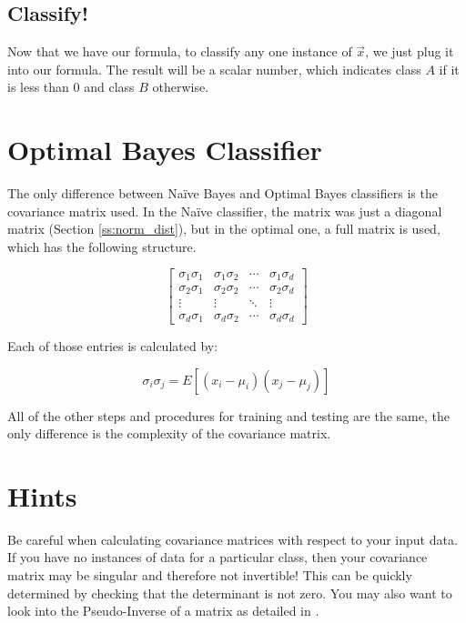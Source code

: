 \documentclass{article}
\begin{document}
\subsection{Classify!}

Now that we have our formula, to classify any one instance of
$\vec{x}$, we just plug it into our formula.  The result will be a
scalar number, which indicates class $A$ if it is less than $0$ and class
$B$ otherwise.



\section{Optimal Bayes Classifier}
\label{sec:obayes}

The only difference between Na\"ive Bayes and Optimal Bayes classifiers
is the covariance matrix used.  In the Na\"ive classifier, the matrix
was just a diagonal matrix (Section \ref{ss:norm_dist}), but in the optimal one,
a full matrix is used, which has the following structure.

\begin{displaymath}
\begin{bmatrix} \sigma_1\sigma_1 & \sigma_1\sigma_2 & \cdots & \sigma_1\sigma_d \\
				 \sigma_2\sigma_1 & \sigma_2\sigma_2 & \cdots & \sigma_2\sigma_d \\
				 \vdots & \vdots & \ddots & \vdots \\
				 \sigma_d\sigma_1 & \sigma_d\sigma_2 & \cdots & \sigma_d\sigma_d
\end{bmatrix}
\end{displaymath}

Each of those entries is calculated by:

\begin{displaymath}
 \sigma_i\sigma_j = E [{(x_i - \mu_i)(x_j - \mu_j)}]
\end{displaymath}

All of the other steps and procedures for training and testing are the
same, the only difference is the complexity of the covariance matrix.


\section{Hints}
\label{sec:hints}

Be careful when calculating covariance matrices with respect to your
input data. If you have no instances of data for a particular class,
then your covariance matrix may be singular and therefore not
invertible!  This can be quickly determined by checking that the
determinant is not zero.  You may also want to look into the Pseudo-Inverse of a
matrix as detailed in \cite{wiki_pinv}.


\end{document}
